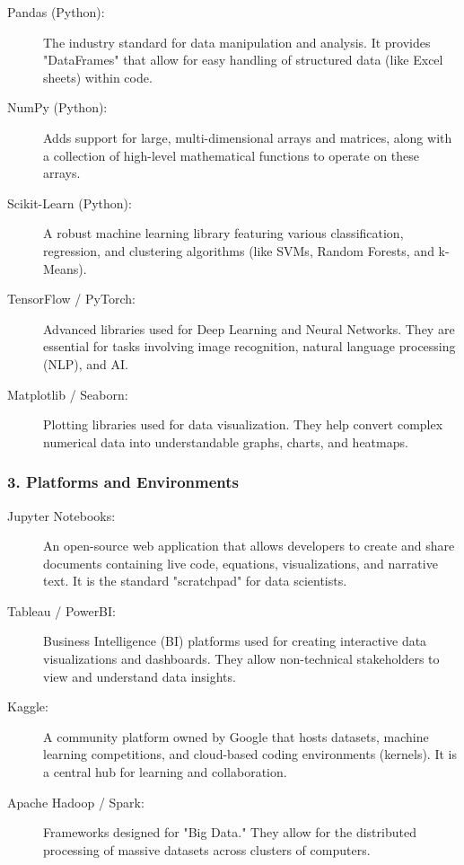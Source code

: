 \documentclass[a4paper,12pt]{article}
\begin{document}
\begin{description}
    \item[Pandas (Python):] The industry standard for data manipulation and analysis. It provides "DataFrames" that allow for easy handling of structured data (like Excel sheets) within code.
    \item[NumPy (Python):] Adds support for large, multi-dimensional arrays and matrices, along with a collection of high-level mathematical functions to operate on these arrays.
    \item[Scikit-Learn (Python):] A robust machine learning library featuring various classification, regression, and clustering algorithms (like SVMs, Random Forests, and k-Means).
    \item[TensorFlow / PyTorch:] Advanced libraries used for Deep Learning and Neural Networks. They are essential for tasks involving image recognition, natural language processing (NLP), and AI.
    \item[Matplotlib / Seaborn:] Plotting libraries used for data visualization. They help convert complex numerical data into understandable graphs, charts, and heatmaps.
\end{description}

\subsubsection{3. Platforms and Environments}
\begin{description}
    \item[Jupyter Notebooks:] An open-source web application that allows developers to create and share documents containing live code, equations, visualizations, and narrative text. It is the standard "scratchpad" for data scientists.
    \item[Tableau / PowerBI:] Business Intelligence (BI) platforms used for creating interactive data visualizations and dashboards. They allow non-technical stakeholders to view and understand data insights.
    \item[Kaggle:] A community platform owned by Google that hosts datasets, machine learning competitions, and cloud-based coding environments (kernels). It is a central hub for learning and collaboration.
    \item[Apache Hadoop / Spark:] Frameworks designed for "Big Data." They allow for the distributed processing of massive datasets across clusters of computers.
\end{description}
\end{document}
